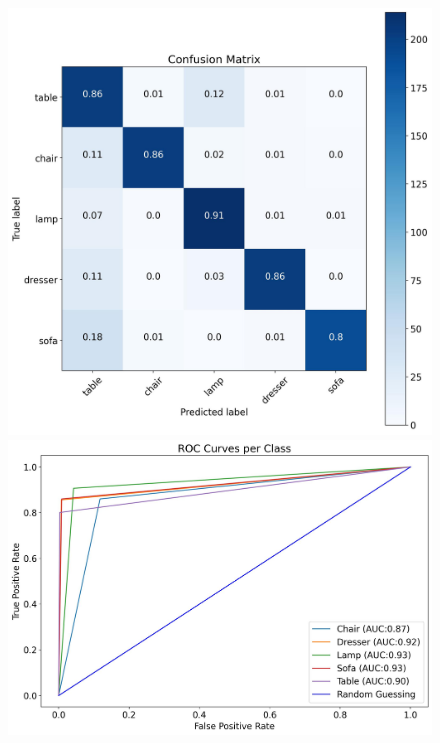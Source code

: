 \documentclass[11pt,a4paper]{article}
\begin{document}
\begin{figure}[H]
{{    \includegraphics[scale=0.13]{imgs/experiments/pointclouds/pointnet-6/PointNet-6-TESTING-confusion-matrix.jpg}
    \includegraphics[scale=0.13]{imgs/experiments/pointclouds/pointnet-6/PointNet-6-TESTING-ROC.jpg}
    }}
    \qquad
\end{figure}
\end{document}
